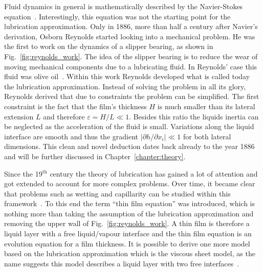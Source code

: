 Fluid dynamics in general is mathematically described by the Navier-Stokes equation~\cite{Navier, Stokes}.
Interestingly, this equation was not the starting point for the lubrication approximation.
Only in 1886, more than half a century after Navier's derivation, Osborn Reynolds started looking into a mechanical problem. 
He was the first to work on the dynamics of a slipper bearing, as shown in Fig.~\ref{fig:reynolds_work}.
The idea of the slipper bearing is to reduce the wear of moving mechanical components due to a lubricating fluid. 
In Reynolds' case this fluid was olive oil~\cite{reynoldsTheoryLubricationIts1886}.
Within this work Reynolds developed what is called today the lubrication approximation.
Instead of solving the problem in all its glory, Reynolds derived that due to constraints the problem can be simplified. 
The first constraint is the fact that the film's thickness $H$ is much smaller than its lateral extension $L$ and therefore $\varepsilon = H/L \ll 1$. 
Besides this ratio the liquids inertia can be neglected as the acceleration of the fluid is small.
Variations along the liquid interface are smooth and thus the gradient $|\partial h/\partial x_i| \ll 1$ for both lateral dimensions.
This clean and novel deduction dates back already to the year 1886 and will be further discussed in Chapter~\ref{chapter:theory}.

Since the 19$^{\text{th}}$ century the theory of lubrication has gained a lot of attention and got extended to account for more complex problems.
Over time, it became clear that problems such as wetting and capillarity can be studied within this framework~\cite{degennesWettingStaticsDynamics1985, oronLongscaleEvolutionThin1997, crasterDynamicsStabilityThin2009}.
To this end the term ``thin film equation'' was introduced, which is nothing more than taking the assumption of the lubrication approximation and removing the upper wall of Fig.~\ref{fig:reynolds_work}.
A thin film is therefore a liquid layer with a free liquid/vapour interface and the thin film equation is an evolution equation for a film thickness.
It is possible to derive one more model based on the lubrication approximation which is the viscous sheet model, as the name suggests this model describes a liquid layer with two free interfaces~\cite{savvaViscousSheetRetraction2009}.

